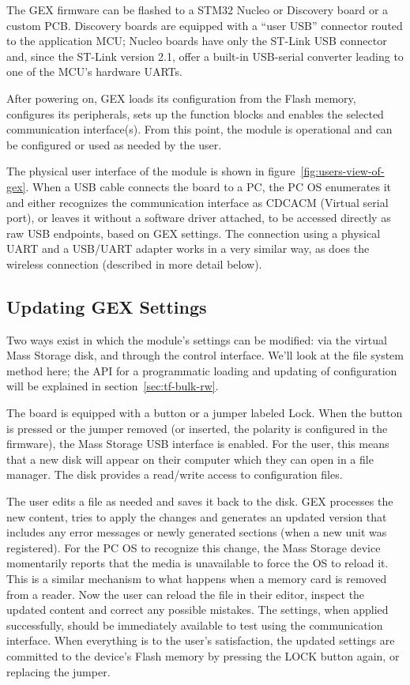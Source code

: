 The GEX firmware can be flashed to a STM32 Nucleo or Discovery board or a custom \gls{PCB}. Discovery boards are equipped with a ``user \gls{USB}'' connector routed to the application \gls{MCU}; Nucleo boards have only the ST-Link \gls{USB} connector and, since the ST-Link version 2.1, offer a built-in USB-serial converter leading to one of the \gls{MCU}'s hardware \glspl{UART}.

After powering on, GEX loads its configuration from the Flash memory, configures its peripherals, sets up the function blocks and enables the selected communication interface(s). From this point, the module is operational and can be configured or used as needed by the user.

The physical user interface of the module is shown in figure~\ref{fig:users-view-of-gex}. When a \gls{USB} cable connects the board to a \gls{PC}, the \gls{PC} \gls{OS} enumerates it and either recognizes the communication interface as \gls{CDCACM} (Virtual serial port), or leaves it without a software driver attached, to be accessed directly as raw \gls{USB} endpoints, based on GEX settings.
The connection using a physical UART and a USB/UART adapter works in a very similar way, as does the wireless connection (described in more detail below).

\subsection{Updating GEX Settings}

Two ways exist in which the module's settings can be modified: via the virtual Mass Storage disk, and through the control interface. We'll look at the file system method here; the API for a programmatic loading and updating of configuration will be explained in section~\ref{sec:tf-bulk-rw}.

The board is equipped with a button or a jumper labeled Lock. When the button is pressed or the jumper removed (or inserted, the polarity is configured in the firmware), the Mass Storage \gls{USB} interface is enabled. For the user, this means that a new disk will appear on their computer which they can open in a file manager. The disk provides a read/write access to configuration files.

The user edits a file as needed and saves it back to the disk. GEX processes the new content, tries to apply the changes and generates an updated version that includes any error messages or newly generated sections (when a new unit was registered). For the \gls{PC} \gls{OS} to recognize this change, the Mass Storage device momentarily reports that the media is unavailable to force the \gls{OS} to reload it. This is a similar mechanism to what happens when a memory card is removed from a reader. Now the user can reload the file in their editor, inspect the updated content and correct any possible mistakes. The settings, when applied successfully, should be immediately available to test using the communication interface. When everything is to the user's satisfaction, the updated settings are committed to the device's Flash memory by pressing the LOCK button again, or replacing the jumper.

